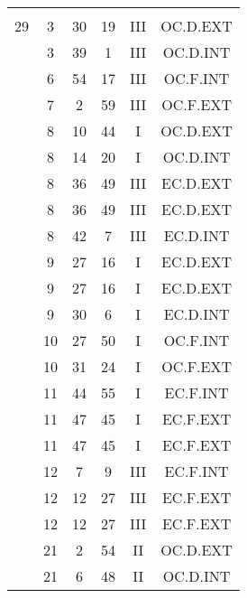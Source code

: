 \documentclass[12pt, a4paper]{article}
\begin{document}
\begin{multicols}{3}
{\begin{tabular}{c c c c c c}
	 	 	 	 & & & & & \\%
	 	 	 	29 & 3 & 30 & 19 & III & OC.D.EXT\\%
	 	 	 	 & 3 & 39 & 1 & III & OC.D.INT\\%
	 	 	 	 & 6 & 54 & 17 & III & OC.F.INT\\%
	 	 	 	 & 7 & 2 & 59 & III & OC.F.EXT\\%
	 	 	 	 & 8 & 10 & 44 & I & OC.D.EXT\\%
	 	 	 	 & 8 & 14 & 20 & I & OC.D.INT\\%
	 	 	 	 & 8 & 36 & 49 & III & EC.D.EXT\\%
	 	 	 	 & 8 & 36 & 49 & III & EC.D.EXT\\%
	 	 	 	 & 8 & 42 & 7 & III & EC.D.INT\\%
	 	 	 	 & 9 & 27 & 16 & I & EC.D.EXT\\%
	 	 	 	 & 9 & 27 & 16 & I & EC.D.EXT\\%
	 	 	 	 & 9 & 30 & 6 & I & EC.D.INT\\%
	 	 	 	 & 10 & 27 & 50 & I & OC.F.INT\\%
	 	 	 	 & 10 & 31 & 24 & I & OC.F.EXT\\%
	 	 	 	 & 11 & 44 & 55 & I & EC.F.INT\\%
	 	 	 	 & 11 & 47 & 45 & I & EC.F.EXT\\%
	 	 	 	 & 11 & 47 & 45 & I & EC.F.EXT\\%
	 	 	 	 & 12 & 7 & 9 & III & EC.F.INT\\%
	 	 	 	 & 12 & 12 & 27 & III & EC.F.EXT\\%
	 	 	 	 & 12 & 12 & 27 & III & EC.F.EXT\\%
	 	 	 	 & 21 & 2 & 54 & II & OC.D.EXT\\%
	 	 	 	 & 21 & 6 & 48 & II & OC.D.INT\\%

\end{tabular}}
\end{multicols}
\end{document}
